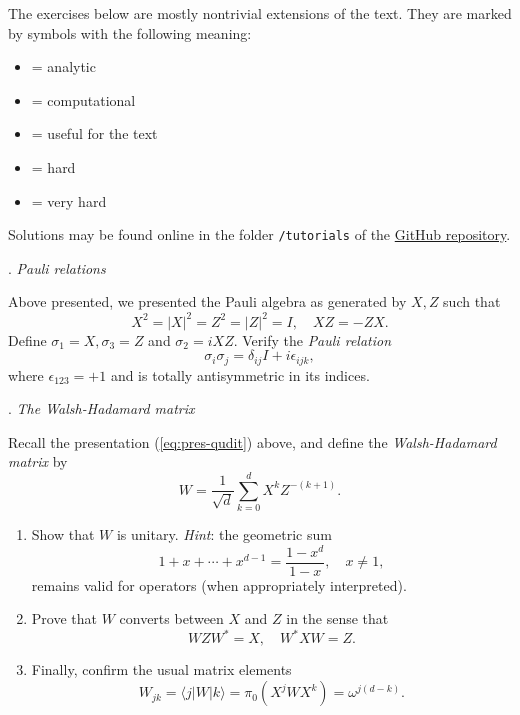 The exercises below are mostly nontrivial extensions of the
text. They are marked by symbols with the following meaning:
\begin{itemize}[itemsep=-1pt]
\item {} = analytic
\item {} = computational
\item {} = useful for the text
\item {} = hard
\item {} = very hard
\end{itemize}
Solutions may be found online in the folder \texttt{/tutorials} of the
\href{https://github.com/torsor-io/yaw}{GitHub repository}.


\vspace{5pt}
\begin{Large}
. \emph{Pauli relations} 
\end{Large}
\vspace{5pt}

\noindent Above presented, we presented the Pauli algebra as generated
by $X, Z$ such that
\[
  X^2 = |X|^2 = Z^2 = |Z|^2 = I, \quad XZ = -ZX.
\]
Define $\sigma_1 = X, \sigma_3 = Z$ and $\sigma_2=i XZ$.
Verify the \emph{Pauli relation}
\[
  \sigma_i \sigma_j = \delta_{ij} I + i \epsilon_{ijk},
\]
where $\epsilon_{123} = +1$ and is totally antisymmetric in its indices.

\vspace{5pt}
\begin{Large}
. \emph{The Walsh-Hadamard matrix}   %
\end{Large}
\vspace{5pt}

\noindent Recall the presentation (\ref{eq:pres-qudit}) above, and
define the \emph{Walsh-Hadamard matrix} by
\begin{equation}
  \label{eq:2}
  W = \frac{1}{\sqrt{d}}\sum_{k=0}^d X^k Z^{-(k+1)}.
\end{equation}
\begin{enumerate}[label=(\alph*), itemsep=-1pt]
\item Show that $W$ is unitary. \emph{Hint}: the geometric sum
  \[
    1 + x + \cdots + x^{d-1} = \frac{1 - x^d}{1-x}, \quad x \neq 1,
  \]
  remains valid for operators (when appropriately interpreted).
\item Prove that $W$ converts between $X$ and $Z$ in the sense that
  \begin{equation}
    \label{eq:4}
    W Z W^* = X, \quad W^* X W = Z.
  \end{equation}
\item Finally, confirm the usual matrix elements
  \[
    W_{jk} = \langle j | W |k \rangle = \pi_0 (X^ j W X^k) = \omega^{j(d-k)}.
  \]
\end{enumerate}

